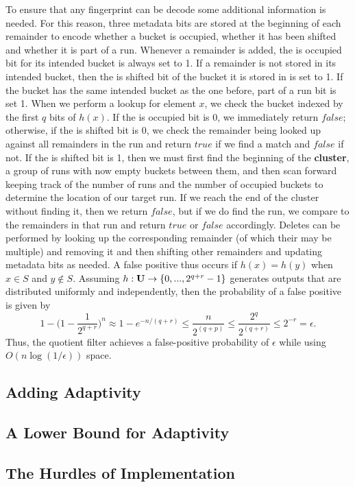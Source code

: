 \documentclass[../paper.tex]{subfiles}
\begin{document}
    To ensure that any fingerprint can be decode some additional information is
    needed.   For this reason, three metadata bits are stored at the beginning
    of each remainder to encode whether a bucket is occupied, whether it has
    been shifted and whether it is part of a run.  Whenever a remainder is
    added, the is occupied bit for its intended bucket is always set to 1.  If
    a remainder is not stored in its intended bucket, then the is shifted bit
    of the bucket it is stored in is set to 1.  If the bucket has the same
    intended bucket as the one before, part of a run bit is set 1.  When we
    perform a lookup for element $x$, we check the bucket indexed by the first
    $q$ bits of $h(x)$.  If the is occupied bit is 0, we immediately return
    $false$; otherwise, if the is shifted bit is 0, we check the remainder
    being looked up against all remainders in the run and return $true$ if we
    find a match and $false$ if not.  If the is shifted bit is 1, then we must
    first find the beginning of the {\bf cluster}, a group of runs with now
    empty buckets between them, and then scan forward keeping track of the
    number of runs and the number of occupied buckets to determine the location
    of our target run.  If we reach the end of the cluster without finding it,
    then we return $false$, but if we do find the run, we compare to the
    remainders in that run and return $true$ or $false$ accordingly.  Deletes
    can be performed by looking up the corresponding remainder (of which their
    may be multiple) and removing it and then shifting other remainders and
    updating metadata bits as needed.  A false positive thus occurs if $h(x) =
    h(y)$ when $x \in S$ and $y \notin S$.  Assuming $h: {\bf U} \rightarrow
    \{0, ... , 2^{q+r}-1\}$ generates outputs that are distributed uniformly
    and independently, then the probability of a false positive is given by $$
    1 - \big(1 - \frac{1}{2^{q+r}}\big)^n \approx 1- e^{-n/(q+r)} \leq
    \frac{n}{2^{(q+p)}} \leq \frac{2^q}{2^{(q+r)}} \leq 2^{-r} = \epsilon .$$
    Thus, the quotient filter achieves a false-positive probability of
    $\epsilon$ while using $O(n \log (1/\epsilon))$ space.  	

\subsection{Adding Adaptivity}
	

\subsection{A Lower Bound for Adaptivity}


\subsection{The Hurdles of Implementation}
\end{document}
